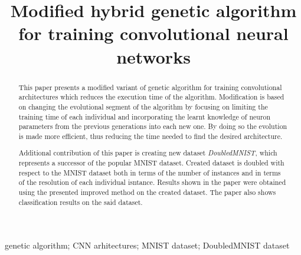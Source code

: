 \documentclass[eng]{simposium}
\begin{document}
\begin{frontmatter}

\title{Modified hybrid genetic algorithm for training convolutional neural networks}

\author{\textbf{ }}
\address{Faculty of Mathematics, University of Belgrade, Studentski trg 16, 11000 Belgrade\\
}
\author{\textbf{ }}
\address{Microsoft Development Center Serbia, Španskih boraca 3, 11000 Belgrade\\
}
\author{\textbf{ }}
\address{Faculty of Mathematics, University of Belgrade, Studentski trg 16, 11000 Belgrade\\
}


\maketitle
\begin{abstract}
    
This paper presents a modified variant of genetic algorithm for training convolutional architectures which reduces the execution time of the algorithm. 
Modification is based on changing the evolutional segment of the algorithm by focusing on limiting the training time of each individual and incorporating the 
learnt knowledge of neuron parameters from the previous generations into each new one. By doing so the evolution is made more efficient, thus reducing the time 
needed to find the desired architecture.

Additional contribution of this paper is creating new dataset \textit{DoubledMNIST}, which represents a successor of the popular MNIST dataset.
Created dataset is doubled with respect to the MNIST dataset both in terms of the number of instances and in terms of the resolution of each individual isntance.
Results shown in the paper were obtained using the presented improved method on the created dataset. The paper also shows classification results on the said dataset.
\end{abstract}

\begin{keyword}
genetic algorithm; CNN arhitectures; MNIST dataset; DoubledMNIST dataset
\end{keyword}
\end{frontmatter}
\end{document}
